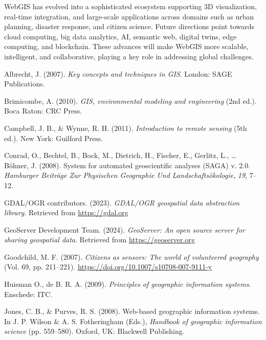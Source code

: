 \documentclass[
  11pt,
  letterpaper,
]{book}
\newlength{\cslhangindent}
\newenvironment{CSLReferences}[2] %
 {\begin{list}{}{%
  \setlength{\itemindent}{0pt}
  \setlength{\leftmargin}{0pt}
  \setlength{\parsep}{0pt}
  \ifodd #1
   \setlength{\leftmargin}{\cslhangindent}
   \setlength{\itemindent}{-1\cslhangindent}
  \fi
  \setlength{\itemsep}{#2\baselineskip}}}
 {\end{list}}
\begin{document}
WebGIS has evolved into a sophisticated ecosystem supporting 3D
visualization, real-time integration, and large-scale applications
across domains such as urban planning, disaster response, and citizen
science. Future directions point towards cloud computing, big data
analytics, AI, semantic web, digital twins, edge computing, and
blockchain. These advances will make WebGIS more scalable, intelligent,
and collaborative, playing a key role in addressing global challenges.

\label{refs}
\begin{CSLReferences}{1}{0}
Albrecht, J. (2007). \emph{Key concepts and techniques in GIS}. London:
SAGE Publications.

Brimicombe, A. (2010). \emph{GIS, environmental modeling and
engineering} (2nd ed.). Boca Raton: CRC Press.

Campbell, J. B., \& Wynne, R. H. (2011). \emph{Introduction to remote
sensing} (5th ed.). New York: Guilford Press.

Conrad, O., Bechtel, B., Bock, M., Dietrich, H., Fischer, E., Gerlitz,
L., \ldots{} Böhner, J. (2008). System for automated geoscientific
analyses (SAGA) v. 2.0. \emph{Hamburger Beiträge Zur Physischen
Geographie Und Landschaftsökologie}, \emph{19}, 7--12.

GDAL/OGR contributors. (2023). \emph{GDAL/OGR geospatial data
abstraction library}. Retrieved from \url{https://gdal.org}

GeoServer Development Team. (2024). \emph{GeoServer: An open source
server for sharing geospatial data}. Retrieved from
\url{https://geoserver.org}

Goodchild, M. F. (2007). \emph{Citizens as sensors: The world of
volunteered geography} (Vol. 69, pp. 211--221).
\url{https://doi.org/10.1007/s10708-007-9111-y}

Huisman O., de B. R. A. (2009). \emph{Principles of geographic
information systems}. Enschede: ITC.

Jones, C. B., \& Purves, R. S. (2008). Web-based geographic information
systems. In J. P. Wilson \& A. S. Fotheringham (Eds.), \emph{Handbook of
geographic information science} (pp. 559--580). Oxford, UK: Blackwell
Publishing.


\end{CSLReferences}
\end{document}
